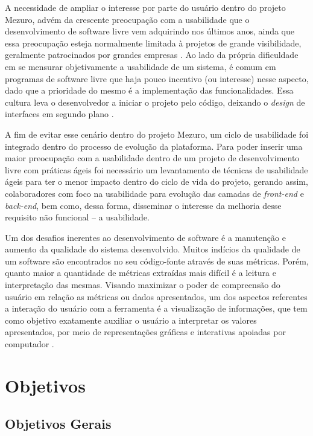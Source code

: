 A necessidade de ampliar o interesse por parte do usuário dentro do projeto Mezuro, advém da crescente preocupação com a usabilidade que o desenvolvimento de software livre vem adquirindo nos últimos anos, ainda que essa preocupação esteja normalmente limitada à projetos de grande visibilidade, geralmente patrocinados por grandes empresas \cite{nichols2006}.
%
Ao lado da própria dificuldade em se mensurar objetivamente a usabilidade de um sistema, é comum em programas de software livre que haja pouco incentivo (ou interesse) nesse aspecto, dado que a prioridade do mesmo é a implementação das funcionalidades. Essa cultura leva o desenvolvedor a iniciar o projeto pelo código, deixando o \emph{design} de interfaces em segundo plano  \cite{thomas2008}.

A fim de evitar esse cenário dentro do projeto Mezuro, um ciclo de usabilidade foi integrado dentro do processo de evolução da plataforma. Para poder inserir uma maior preocupação com a usabilidade dentro de um projeto de desenvolvimento livre com práticas ágeis foi necessário um levantamento de técnicas de usabilidade ágeis para ter o menor impacto dentro do ciclo de vida do projeto, gerando assim, colaboradores com foco na usabilidade para evolução das camadas de \textit{front-end} e \textit{back-end}, bem como, dessa forma, disseminar o interesse da melhoria desse requisito não funcional -- a usabilidade.

Um dos desafios inerentes ao desenvolvimento de software é a manutenção e aumento da qualidade do sistema desenvolvido. Muitos indícios da qualidade de um software são encontrados no seu código-fonte através de suas métricas. Porém, quanto maior a quantidade de métricas extraídas mais difícil é a leitura e interpretação das mesmas.
%
Visando maximizar o poder de compreensão do usuário em relação as métricas ou dados apresentados, um dos aspectos referentes a interação do usuário com a ferramenta é a visualização de informações, que tem como objetivo exatamente auxiliar o usuário a interpretar os valores apresentados, por meio de representações gráficas e interativas apoiadas por computador \cite{rafaelmessiasmartins2012}.

\section{Objetivos}

\subsection{Objetivos Gerais}

